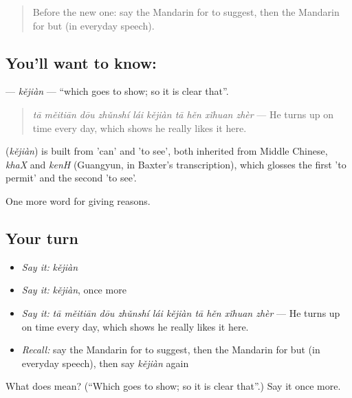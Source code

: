 \begin{quote}
Before the new one: say the Mandarin for to suggest, then the Mandarin for but (in everyday speech).
\end{quote}

\subsection*{You'll want to know: }
\textbf{} — \emph{kějiàn} — \textquotedblleft{}which goes to show; so it is clear that\textquotedblright{}.

\begin{quote}
\textbf{} \emph{tā měitiān dōu zhǔnshí lái kějiàn tā hěn xǐhuan zhèr} — He turns up on time every day, which shows he really likes it here.
\end{quote}

\begin{cousinweb}
\textbf{} (\emph{kějiàn}) is built from  'can' and  'to see', both inherited from Middle Chinese, \emph{khaX} and \emph{kenH} (Guangyun, in Baxter's transcription), which glosses the first 'to permit' and the second 'to see'.
\end{cousinweb}

\begin{grammarlens}[title={What you've built}]
One more word for giving reasons.
\end{grammarlens}

\subsection*{Your turn}
\begin{itemize}
\raggedright
  \item \emph{Say it:} \emph{kějiàn}
  \item \emph{Say it:} \emph{kějiàn}, once more
  \item \emph{Say it:} \emph{tā měitiān dōu zhǔnshí lái kějiàn tā hěn xǐhuan zhèr} — He turns up on time every day, which shows he really likes it here.
  \item \emph{Recall:} say the Mandarin for to suggest, then the Mandarin for but (in everyday speech), then say \emph{kějiàn} again
\end{itemize}

\begin{tcolorbox}[breakable,colback=teal!4,colframe=teal!35!black,title={Before you move on}]
What does  mean? (\textquotedblleft{}Which goes to show; so it is clear that\textquotedblright{}.) Say it once more.
\end{tcolorbox}
